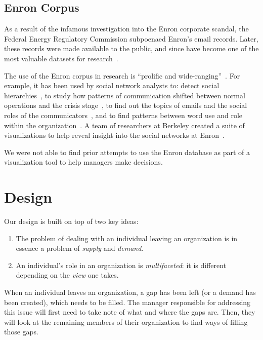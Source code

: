 \documentclass[journal]{vgtc}                %
\begin{document}
\subsection{Enron Corpus}

As a result of the infamous investigation into the Enron corporate scandal, the Federal Energy Regulatory Commission subpoenaed Enron's email records. Later, these records were made available to the public, and since have become one of the most valuable datasets for research~\cite{networkanalysis2015hardin}. 

The use of the Enron corpus in research is ``prolific and wide-ranging''~\cite{networkanalysis2015hardin}. For example, it has been used by social network analysts to: detect social hierarchies~\cite{rowe2007automated}, to study how patterns of communication shifted between normal operations and the crisis stage~\cite{diesner2005communication,diesner2005exploration},  to find out the topics of emails and the social roles of the communicators~\cite{mccallum2007topic}, and to find patterns between word use and role within the organization~\cite{keila2005structure}. A team of researchers at Berkeley created a suite of visualizations to help reveal insight into the social networks at Enron~\cite{heer2005exploring}. 

We were not able to find prior attempts to use the Enron database as part of a visualization tool to help managers make decisions. 

\section{Design}
\label{sec:design}

Our design is built on top of two key ideas:

\begin{enumerate}
\item The problem of dealing with an individual leaving an organization is in essence a problem of \emph{supply} and \emph{demand}. 
\item An individual's role in an organization is \emph{multifaceted}: it is different depending on the \emph{view} one takes.
\end{enumerate}

When an individual leaves an organization, a gap has been left (or a demand has been created), which needs to be filled. The manager responsible for addressing this issue will first need to take note of what and where the gaps are. Then, they will look at the remaining members of their organization to find ways of filling those gaps.
\end{document}
